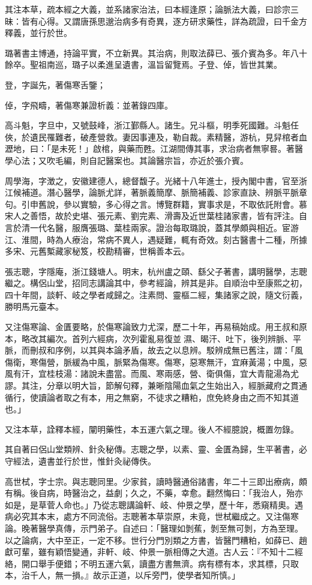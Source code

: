 \begin{pinyinscope}
其注本草，疏本經之大義，並系諸家治法，曰本經逢原；論脈法大義，曰診宗三昧：皆有心得。又謂唐孫思邈治病多有奇異，逐方研求藥性，詳為疏證，曰千金方釋義，並行於世。

璐著書主博通，持論平實，不立新異。其治病，則取法薛已、張介賓為多。年八十餘卒。聖祖南巡，璐子以柔進呈遺書，溫旨留覽焉。子登、倬，皆世其業。

登，字誕先，著傷寒舌鑒；

倬，字飛疇，著傷寒兼證析義：並著錄四庫。

高斗魁，字旦中，又號鼓峰，浙江鄞縣人。諸生。兄斗樞，明季死國難。斗魁任俠，於遺民罹難者，破產營救。妻因事連及，勒自裁。素精醫，游杭，見舁棺者血瀝地，曰：「是未死！」啟棺，與藥而甦。江湖間傳其事，求治病者無寧晷。著醫學心法；又吹毛編，則自記醫案也。其論醫宗旨，亦近於張介賓。

周學海，字澂之，安徽建德人，總督馥子。光緒十八年進士，授內閣中書，官至浙江候補道。潛心醫學，論脈尤詳，著脈義簡摩、脈簡補義、診家直訣、辨脈平脈章句。引申舊說，參以實驗，多心得之言。博覽群籍，實事求是，不取依託附會。慕宋人之善悟，故於史堪、張元素、劉完素、滑壽及近世葉桂諸家書，皆有評注。自言於清一代名醫，服膺張璐、葉桂兩家。證治每取璐說，蓋其學頗與相近。宦游江、淮間，時為人療治，常病不異人，遇疑難，輒有奇效。刻古醫書十二種，所據多宋、元舊槧藏家秘笈，校勘精審，世稱善本云。

張志聰，字隱庵，浙江錢塘人。明末，杭州盧之頤、繇父子著書，講明醫學，志聰繼之。構侶山堂，招同志講論其中，參考經論，辨其是非。自順治中至康熙之初，四十年間，談軒、岐之學者咸歸之。注素問、靈樞二經，集諸家之說，隨文衍義，勝明馬元臺本。

又注傷寒論、金匱要略，於傷寒論致力尤深，歷二十年，再易稿始成。用王叔和原本，略改其編次。首列六經病，次列霍亂易復並濕、暍汗、吐下，後列辨脈、平脈，而刪叔和序例，以其與本論矛盾，故去之以息辨。駁辨成無已舊注，謂：「風傷衛，寒傷營，脈緩為中風，脈緊為傷寒。傷寒，惡寒無汗，宜麻黃湯；中風，惡風有汗，宜桂枝湯：諸說未盡當。而風、寒兩感，營、衛俱傷，宜大青龍湯為尤謬。其注，分章以明大旨，節解句釋，兼晰陰陽血氣之生始出入，經脈藏府之貫通循行，使讀論者取之有本，用之無窮，不徒求之糟粕，庶免終身由之而不知其道也。」

又注本草，詮釋本經，闡明藥性，本五運六氣之理。後人不經臆說，概置勿錄。

其自著曰侶山堂類辨、針灸秘傳。志聰之學，以素、靈、金匱為歸，生平著書，必守經法，遺書並行於世，惟針灸祕傳佚。

高世栻，字士宗。與志聰同里。少家貧，讀時醫通俗諸書，年二十三即出療病，頗有稱。後自病，時醫治之，益劇；久之，不藥，幸愈。翻然悔曰：「我治人，殆亦如是，是草菅人命也。」乃從志聰講論軒、岐、仲景之學，歷十年，悉窺精奧。遇病必究其本末，處方不同流俗。志聰著本草崇原，未竟，世栻繼成之。又注傷寒論。晚著醫學真傳，示門弟子。自述曰：「醫理如剝蕉，剝至無可剝，方為至理。以之論病，大中至正，一定不移。世行分門別類之方書，皆醫門糟粕，如薛已、趙獻可輩，雖有穎悟變通，非軒、岐、仲景一脈相傳之大道。古人云：『不知十二經絡，開口舉手便錯；不明五運六氣，讀盡方書無濟。病有標有本，求其標，只取本，治千人，無一損。』故示正道，以斥旁門，使學者知所慎。」


\end{pinyinscope}
